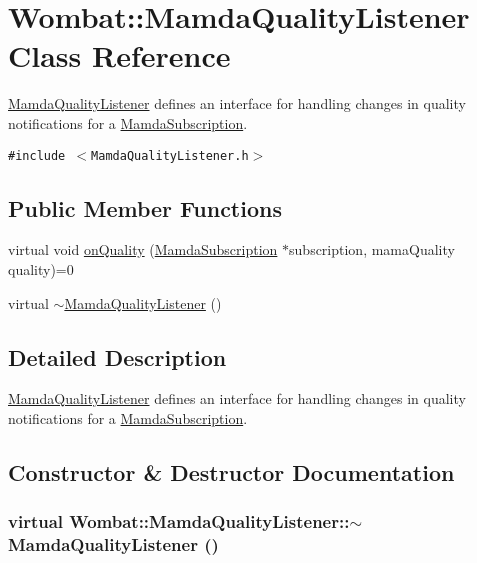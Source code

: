 \hypertarget{classWombat_1_1MamdaQualityListener}{
\section{Wombat::Mamda\-Quality\-Listener Class Reference}
\label{classWombat_1_1MamdaQualityListener}
}
\hyperlink{classWombat_1_1MamdaQualityListener}{Mamda\-Quality\-Listener} defines an interface for handling changes in quality notifications for a \hyperlink{classWombat_1_1MamdaSubscription}{Mamda\-Subscription}.  


{\tt \#include $<$Mamda\-Quality\-Listener.h$>$}

\subsection*{Public Member Functions}
\begin{CompactItemize}
\item 
virtual void \hyperlink{classWombat_1_1MamdaQualityListener_a0677726b0844568e6f172d0707b46d9}{on\-Quality} (\hyperlink{classWombat_1_1MamdaSubscription}{Mamda\-Subscription} $\ast$subscription, mama\-Quality quality)=0
\item 
virtual \hyperlink{classWombat_1_1MamdaQualityListener_2fa904fa74ba6785ed1c34ef858411a0}{$\sim$Mamda\-Quality\-Listener} ()
\end{CompactItemize}


\subsection{Detailed Description}
\hyperlink{classWombat_1_1MamdaQualityListener}{Mamda\-Quality\-Listener} defines an interface for handling changes in quality notifications for a \hyperlink{classWombat_1_1MamdaSubscription}{Mamda\-Subscription}. 



\subsection{Constructor \& Destructor Documentation}
\hypertarget{classWombat_1_1MamdaQualityListener_2fa904fa74ba6785ed1c34ef858411a0}{
\subsubsection[$\sim$MamdaQualityListener]{\setlength{\rightskip}{0pt plus 5cm}virtual Wombat::Mamda\-Quality\-Listener::$\sim$Mamda\-Quality\-Listener ()}}
\label{classWombat_1_1MamdaQualityListener_2fa904fa74ba6785ed1c34ef858411a0}




